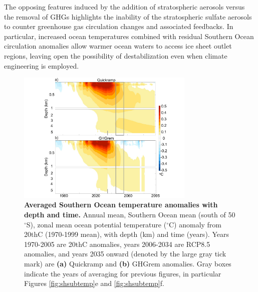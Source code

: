\documentclass[grl]{AGUTeX}  %
\begin{document}
\begin{article}
The opposing features induced by the addition of stratospheric aerosols versus the removal of GHGs highlights the inability of the stratospheric sulfate aerosols to counter greenhouse gas circulation changes and associated feedbacks. In particular, increased ocean temperatures combined with residual Southern Ocean circulation anomalies allow warmer ocean waters to access ice sheet outlet regions, leaving open the possibility of destabilization even when climate engineering is employed.



\begin{figure}[htbp] %
\centering
 \noindent\includegraphics[width=20pc]{figures/SOTEMPtime2.pdf}
\caption{\textbf{Averaged Southern Ocean temperature anomalies with depth and time.} Annual mean, Southern Ocean mean (south of 50$^\circ$S), zonal mean ocean potential temperature ($^\circ$C) anomaly from 20thC (1970-1999 mean), with depth (km) and time (years). Years 1970-2005 are 20thC anomalies, years 2006-2034 are RCP8.5 anomalies, and years 2035 onward (denoted by the large gray tick mark) are \textbf{(a)} Quickramp and \textbf{(b)} GHGrem anomalies. Gray boxes indicate the years of averaging for previous figures, in particular Figures \ref{fig:shsubtemp}e and \ref{fig:shsubtemp}f.}
\label{fig:sotemptime}
\end{figure}


\end{article}
\end{document}
